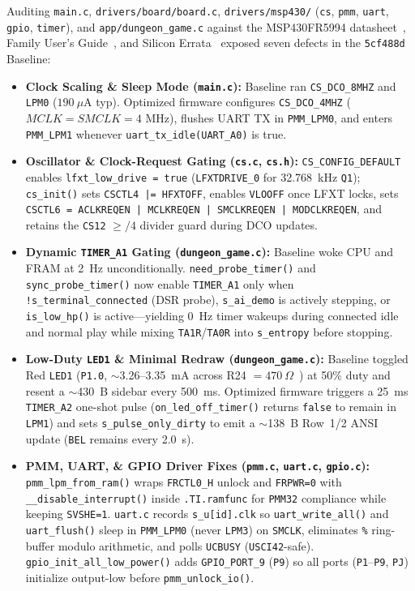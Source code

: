 \documentclass[conference]{IEEEtran}
\begin{document}
Auditing \texttt{main.c}, \texttt{drivers/board/board.c}, \texttt{drivers/msp430/} (\texttt{cs}, \texttt{pmm}, \texttt{uart}, \texttt{gpio}, \texttt{timer}), and \texttt{app/dungeon\_game.c} against the MSP430FR5994 datasheet~\cite{ti_ds}, Family User's Guide~\cite{ti_ug}, and Silicon Errata~\cite{ti_errata} exposed seven defects in the \texttt{5cf488d} Baseline:
\begin{itemize}
    \item \textbf{Clock Scaling \& Sleep Mode (\texttt{main.c}):} Baseline ran \texttt{CS\_DCO\_8MHZ} and \texttt{LPM0} ($190~\mu\text{A}$ typ). Optimized firmware configures \texttt{CS\_DCO\_4MHZ} ($MCLK = SMCLK = 4\text{~MHz}$), flushes UART TX in \texttt{PMM\_LPM0}, and enters \texttt{PMM\_LPM1} whenever \texttt{uart\_tx\_idle(UART\_A0)} is true.
    \item \textbf{Oscillator \& Clock-Request Gating (\texttt{cs.c}, \texttt{cs.h}):} \texttt{CS\_CONFIG\_DEFAULT} enables \texttt{lfxt\_low\_drive = true} (\texttt{LFXTDRIVE\_0} for 32.768~kHz \texttt{Q1}); \texttt{cs\_init()} sets \texttt{CSCTL4 |= HFXTOFF}, enables \texttt{VLOOFF} once LFXT locks, sets \texttt{CSCTL6 = ACLKREQEN | MCLKREQEN | SMCLKREQEN | MODCLKREQEN}, and retains the \texttt{CS12} $\ge /4$ divider guard during DCO updates.
    \item \textbf{Dynamic \texttt{TIMER\_A1} Gating (\texttt{dungeon\_game.c}):} Baseline woke CPU and FRAM at 2~Hz unconditionally. \texttt{need\_probe\_timer()} and \texttt{sync\_probe\_timer()} now enable \texttt{TIMER\_A1} only when \texttt{!s\_terminal\_connected} (DSR probe), \texttt{s\_ai\_demo} is actively stepping, or \texttt{is\_low\_hp()} is active---yielding 0~Hz timer wakeups during connected idle and normal play while mixing \texttt{TA1R}/\texttt{TA0R} into \texttt{s\_entropy} before stopping.
    \item \textbf{Low-Duty \texttt{LED1} \& Minimal Redraw (\texttt{dungeon\_game.c}):} Baseline toggled Red \texttt{LED1} (\texttt{P1.0}, $\sim$3.26--3.35~mA across R24 $= 470~\Omega$~\cite{ti_lp}) at 50\% duty and resent a $\sim$430~B sidebar every 500~ms. Optimized firmware triggers a 25~ms \texttt{TIMER\_A2} one-shot pulse (\texttt{on\_led\_off\_timer()} returns \texttt{false} to remain in \texttt{LPM1}) and sets \texttt{s\_pulse\_only\_dirty} to emit a $\sim$138~B Row~1/2 ANSI update (\texttt{BEL} remains every 2.0~s).
    \item \textbf{PMM, UART, \& GPIO Driver Fixes (\texttt{pmm.c}, \texttt{uart.c}, \texttt{gpio.c}):} \texttt{pmm\_lpm\_from\_ram()} wraps \texttt{FRCTL0\_H} unlock and \texttt{FRPWR=0} with \texttt{\_\_disable\_interrupt()} inside \texttt{.TI.ramfunc} for \texttt{PMM32} compliance while keeping \texttt{SVSHE=1}. \texttt{uart.c} records \texttt{s\_u[id].clk} so \texttt{uart\_write\_all()} and \texttt{uart\_flush()} sleep in \texttt{PMM\_LPM0} (never \texttt{LPM3}) on \texttt{SMCLK}, eliminates \texttt{\%} ring-buffer modulo arithmetic, and polls \texttt{UCBUSY} (\texttt{USCI42}-safe). \texttt{gpio\_init\_all\_low\_power()} adds \texttt{GPIO\_PORT\_9} (\texttt{P9}) so all ports (\texttt{P1}--\texttt{P9}, \texttt{PJ}) initialize output-low before \texttt{pmm\_unlock\_io()}.
\end{itemize}
\end{document}
